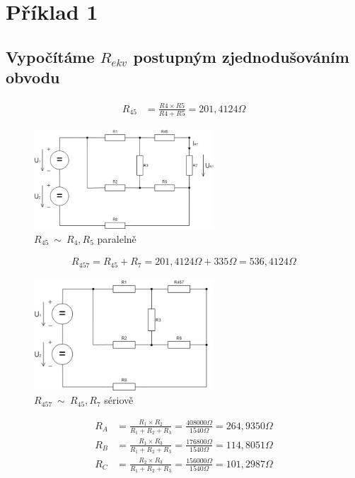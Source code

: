 \section{Příklad 1}

\centering
\subsection{Vypočítáme $R_{ekv}$ postupným zjednodušováním obvodu}
\begin{align*}
R_{45} &= \frac{R4 \times R5}{R4 + R5} = 201,4124 \Omega
\end{align*}

\begin{figure}[H]
    \centering
    \includegraphics[width=0.6\textwidth]{fig/Pr1_1.png}
    \caption{$R_{45}~\sim~R_4,R_5$ paralelně}
\end{figure}

\begin{align*}
R_{457} = R_{45} + R_7 = 201,4124\Omega + 335\Omega = 536,4124\Omega
\end{align*}

\begin{figure}[H]
    \centering
    \includegraphics[width=0.6\textwidth]{fig/Pr1_2.png}
    \caption{$R_{457}~\sim~R_{45},R_7$ sériově}
\end{figure}

\begin{align*}
R_A &= \frac {R_1 \times R_2} {R_1 + R_2 + R_3} = \frac {408000\Omega} {1 540\Omega} = 264,9350\Omega\\
R_B &= \frac {R_1 \times R_3} {R_1 + R_2 + R_3} = \frac {176800\Omega} {1 540\Omega} = 114,8051\Omega\\
R_C &= \frac {R_2 \times R_3} {R_1 + R_2 + R_3} = \frac {156000\Omega} {1 540\Omega} = 101,2987\Omega
\end{align*}

